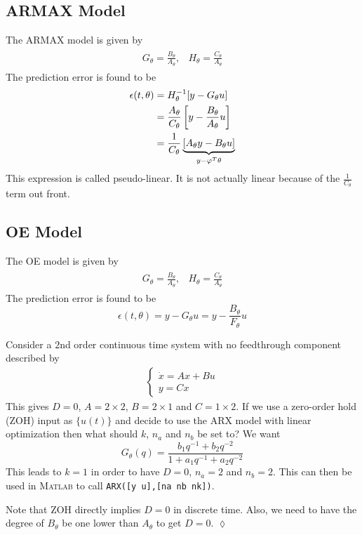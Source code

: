 \subsection{ARMAX Model}
The ARMAX model is given by
\begin{align*}
\begin{split}
G_\theta = \frac{B_\theta}{A_\theta},
\end{split}
\begin{split}
H_\theta = \frac{C_\theta}{A_\theta}
\end{split}
\end{align*}
The prediction error is found to be
\begin{align*}
\epsilon(t,\theta) &= H_\theta^{-1}[y-G_\theta u] \\
&= \frac{A_\theta}{C_\theta}\left[y-\frac{B_\theta}{A_\theta}u\right] \\
&= \frac{1}{C_\theta}\underbrace{\left[A_\theta y-B_\theta u\right]}_{y-\varphi^T\theta}
\end{align*}
This expression is called pseudo-linear. It is not actually linear because of the $\frac{1}{C_\theta}$ term out front.

\subsection{OE Model}
The OE model is given by
\begin{align*}
\begin{split}
G_\theta = \frac{B_\theta}{A_\theta},
\end{split}
\begin{split}
H_\theta = \frac{C_\theta}{A_\theta}
\end{split}
\end{align*}
The prediction error is found to be
$$\epsilon(t,\theta) = y-G_\theta u = y-\frac{B_\theta}{F_\theta}u$$

\begin{example}
Consider a $2$nd order continuous time system with no feedthrough component described by
\begin{align*}
\begin{cases} \dot{x}=Ax+Bu \\ y=Cx \end{cases}
\end{align*}
This gives $D=0$, $A=2\times 2$, $B=2\times 1$ and $C=1\times 2$. If we use a zero-order hold (ZOH) input as $\{u(t)\}$ and decide to use the ARX model with linear optimization then what should $k$, $n_a$ and $n_b$ be set to? We want
$$G_\theta(q) = \frac{b_1q^{-1}+b_2q^{-2}}{1+a_1q^{-1}+a_2q^{-2}}$$
This leads to $k=1$ in order to have $D=0$, $n_a=2$ and $n_b=2$. This can then be used in \textsc{Matlab} to call \texttt{ARX([y u],[na nb nk])}.

Note that ZOH directly implies $D=0$ in discrete time. Also, we need to have the degree of $B_\theta$ be one lower than $A_\theta$ to get $D=0$.
$\lozenge$
\end{example}

